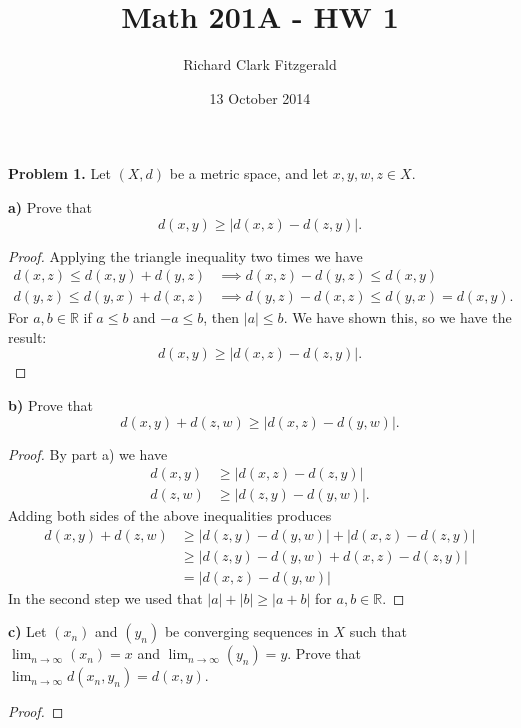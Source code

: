 \documentclass[12pt]{article}
\title{Math 201A - HW 1}
\date{13 October 2014}
\author{Richard Clark Fitzgerald}
\begin{document}
\maketitle

\textbf{Problem 1.}
Let $(X, d)$ be a metric space, and let $x, y, w, z \in X$.

\textbf{a)}
Prove that
\[
    d(x, y) \geq |d(x, z) - d(z, y)|.
\]

\begin{proof}

Applying the triangle inequality two times we have
\begin{align*}
    d(x, z) \leq d(x, y) + d(y, z) 
    &\implies 
    d(x, z) - d(y, z) \leq d(x, y) \\
    d(y, z) \leq d(y, x) + d(x, z)
    &\implies 
    d(y, z) - d(x, z) \leq d(y, x) = d(x, y).
\end{align*}
For $a, b \in \mathbb{R}$ if $a \leq b$ and $-a \leq b$, then
$|a| \leq b$. We have shown this, so we have the result:
\[
    d(x, y) \geq |d(x, z) - d(z, y)|.
\]

\end{proof}

\textbf{b)}
Prove that
\[
    d(x, y) + d(z, w) \geq |d(x, z) - d(y, w)|.
\]

\begin{proof}

By part a) we have
\begin{align*}
   d(x, y) &\geq |d(x, z) - d(z, y)| \\
   d(z, w) &\geq |d(z, y) - d(y, w)|.
\end{align*}
Adding both sides of the above inequalities produces
\begin{align*}
   d(x, y) + d(z, w) &\geq |d(z, y) - d(y, w)| + |d(x, z) - d(z, y)| \\
                     &\geq |d(z, y) - d(y, w) + d(x, z) - d(z, y)|  \\
                     &= |d(x, z) - d(y, w)|
\end{align*}
In the second step we used that $|a| + |b| \geq |a + b|$ for $a, b \in \mathbb{R}$.
\end{proof}

\textbf{c)}
Let $(x_n)$ and $(y_n)$ be converging sequences in $X$ such that $\lim_{n
\rightarrow \infty} (x_n) = x$ and $\lim_{n \rightarrow \infty} (y_n) = y$.
Prove that $\lim_{n \rightarrow \infty} d(x_n, y_n) = d(x, y)$.

\begin{proof}
\end{proof}
\end{document}
